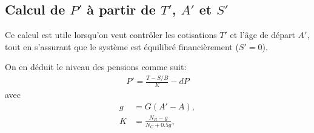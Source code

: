 \documentclass[10pt]{article}
\begin{document}
  \subsection{Calcul de $P'$ à partir de $T'$, $A'$ et $S'$}

  Ce calcul est utile lorsqu'on veut contrôler les cotisations $T'$ et l'âge de départ $A'$, tout en s'assurant que le système est équilibré financièrement ($S'=0$).

  On en déduit le niveau des pensions comme suit:
  \begin{align}
    P' = \frac{T-S/B}{K}-dP
  \end{align}
  avec
  \begin{align}
    g & = G (A'-A), \\
    K & = \frac{N_R-g}{N_C + 0.5g},
  \end{align}

  

  
\end{document}
